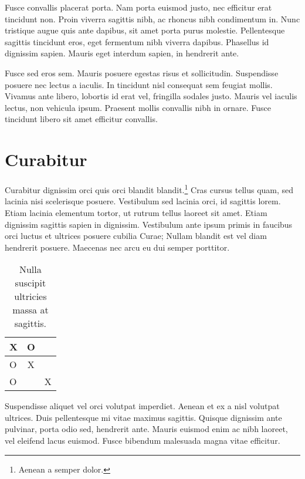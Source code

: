 \documentclass[dissertation]{msudissertation}
\begin{document}
Fusce convallis placerat porta. Nam porta euismod justo, nec efficitur erat tincidunt non. Proin viverra sagittis nibh, ac rhoncus nibh condimentum in. Nunc tristique augue quis ante dapibus, sit amet porta purus molestie. Pellentesque sagittis tincidunt eros, eget fermentum nibh viverra dapibus. Phasellus id dignissim sapien. Mauris eget interdum sapien, in hendrerit ante.

Fusce sed eros sem. Mauris posuere egestas risus et sollicitudin. Suspendisse posuere nec lectus a iaculis. In tincidunt nisl consequat sem feugiat mollis. Vivamus ante libero, lobortis id erat vel, fringilla sodales justo. Mauris vel iaculis lectus, non vehicula ipsum. Praesent mollis convallis nibh in ornare. Fusce tincidunt libero sit amet efficitur convallis.

\section{Curabitur}

Curabitur dignissim orci quis orci blandit blandit.\footnote{Aenean a semper dolor.} Cras cursus tellus quam, sed lacinia nisi scelerisque posuere. Vestibulum sed lacinia orci, id sagittis lorem. Etiam lacinia elementum tortor, ut rutrum tellus laoreet sit amet. Etiam dignissim sagittis sapien in dignissim. Vestibulum ante ipsum primis in faucibus orci luctus et ultrices posuere cubilia Curae; Nullam blandit est vel diam hendrerit posuere. Maecenas nec arcu eu dui semper porttitor.

\begin{landscape}
\begin{table}
  \centering
  \begin{tabular}{l | c | r}
    X & O &   \\ \hline
    O & X &   \\ \hline
    O &   & X \\
  \end{tabular}
  \caption{Nulla suscipit ultricies massa at sagittis.}
\end{table}

Suspendisse aliquet vel orci volutpat imperdiet. Aenean et ex a nisl volutpat ultrices. Duis pellentesque mi vitae maximus sagittis. Quisque dignissim ante pulvinar, porta odio sed, hendrerit ante. Mauris euismod enim ac nibh laoreet, vel eleifend lacus euismod. Fusce bibendum malesuada magna vitae efficitur.
\end{landscape}

\appendix
\end{document}
